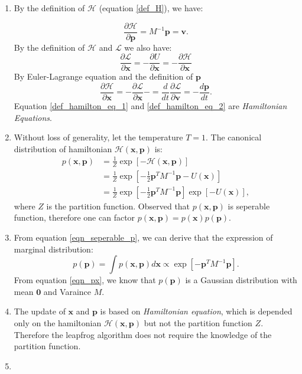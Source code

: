 \documentclass{article}
\begin{document}
\begin{enumerate}
\item 
By the definition of $\mathcal{H}$ (equation \ref{def_H}), we have:

\begin{equation}\label{def_hamilton_eq_1}
\frac{\partial \mathcal{H}}{\partial \textbf{p}} = M^{-1} \textbf{p} =  \textbf{v}.
\end{equation}
By the definition of $\mathcal{H}$ and $\mathcal{L}$ we also have:
\begin{equation}
\frac{\partial \mathcal{L}}{\partial \textbf{x}} = -\frac{\partial U}{\partial \textbf{x}} = -\frac{\partial \mathcal{H}}{\partial \textbf{x}}
\end{equation}
By Euler-Lagrange equation and the definition of $\textbf{p}$
\begin{equation}\label{def_hamilton_eq_2}
\frac{\partial \mathcal{H}}{\partial \textbf{x}} = -\frac{\partial \mathcal{L}}{\partial \textbf{x}} - =\frac{d}{d t} \frac{\partial \mathcal{L}}{\partial \textbf{v}} = -\frac{d \textbf{{p}}}{d t}.
\end{equation}
Equation \ref{def_hamilton_eq_1} and \ref{def_hamilton_eq_2} are \textit{Hamiltonian Equations}.
\pagebreak

\item 
Without loss of generality, let the temperature $T=1$. The canonical distribution of hamiltonian $\mathcal{H (\textbf{x},\textbf{p})}$ is:
\begin{align}
p(\textbf{x},\textbf{p})&=\frac{1}{Z} \exp[ -\mathcal{H (\textbf{x},\textbf{p})} ] \\
&=\frac{1}{Z} \exp [-\frac{1}{2}\textbf{p}^T M^{-1} \textbf{p} - U(\textbf{x})] \nonumber \\
&=\frac{1}{Z}\exp [-\frac{1}{2} \textbf{p}^T M^{-1} \textbf{p}]\exp [-U(\textbf{x})] \label{eqn_seperable_p},
\end{align}
where $Z$ is the partition function.  Observed that $p(\textbf{x},\textbf{p})$ is seperable function, therefore one can factor $p(\textbf{x},\textbf{p})= p(\textbf{x})p(\textbf{p})$.
\pagebreak

\item 
From equation \ref{eqn_seperable_p}, we can derive that the expression of marginal distribution: 
\begin{equation}\label{eqn_px}
p(\textbf{p}) = \int p(\textbf{x}, \textbf{p}) d\textbf{x} \propto  \exp [-\textbf{p}^T M^{-1} \textbf{p} ].
\end{equation}
From equation \ref{eqn_px}, we know that $p(\textbf{p})$ is a Gaussian distribution with mean $\textbf{0}$ and Varaince $M$.
\pagebreak

\item 
The update of $\textbf{x}$ and $\textbf{p}$ is based on \textit{Hamiltonian equation}, which is depended only on the hamiltonian $\mathcal{H (\textbf{x},\textbf{p})}$ but not the partition function $Z$. Therefore the leapfrog algorithm does not require the knowledge of the partition function.

\item 


\end{enumerate}
\end{document}

